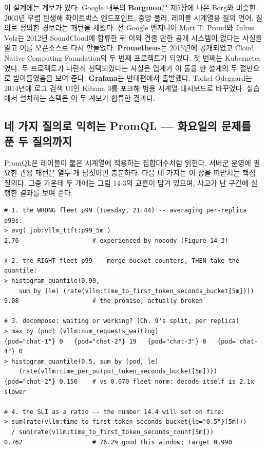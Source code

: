 이 설계에는 계보가 있다. Google 내부의 \textbf{Borgmon}은 제5장에 나온 Borg와 비슷한 2003년 무렵 탄생해 화이트박스  엔드포인트, 중앙 풀러, 레이블 시계열용 질의 언어, 질의로 정의한 경보라는 패턴을 세웠다. 전 Google 엔지니어 Matt T. Proud와 Julius Volz는 2012년 SoundCloud에 합류한 뒤 이와 견줄 만한 공개 시스템이 없다는 사실을 알고 이를 오픈소스로 다시 만들었다. \textbf{Prometheus}는 2015년에 공개되었고 Cloud Native Computing Foundation의 두 번째 프로젝트가 되었다. 첫 번째는 Kubernetes였다. 두 프로젝트가 나란히 선택되었다는 사실은 업계가 이 둘을 한 설계의 두 절반으로 받아들였음을 보여 준다. \textbf{Grafana}는 반대편에서 출발했다. Torkel Ödegaard는 2014년에 로그 검색 UI인 Kibana 3를 포크해 범용 시계열 대시보드로 바꾸었다. 실습에서 설치하는 스택은 이 두 계보가 합류한 결과다.

\subsection*{네 가지 질의로 익히는 PromQL — 화요일의 문제를 푼 두 질의까지}

PromQL은 레이블이 붙은 시계열에 적용하는 집합대수처럼 읽힌다. 서버군 운영에 필요한 관용 패턴은 열두 개 남짓이면 충분하다. 다음 네 가지는 이 장을 떠받치는 핵심 질의다. 그중 가운데 두 개에는 그림 14-3의 교훈이 담겨 있으며, 사고가 난 구간에 실행한 결과를 보여 준다.

\begin{terminalbox}
\begin{Verbatim}[breaklines=true,breakanywhere=true,fontsize=\small,formatcom=\color{tbbtermfg},codes=\tbbcodeactive]
# 1. the WRONG fleet p99 (tuesday, 21:44) -- averaging per-replica p99s:
> avg( job:vllm_ttft:p99_5m )
2.76                    # experienced by nobody (Figure 14-3)

# 2. the RIGHT fleet p99 -- merge bucket counters, THEN take the quantile:
> histogram_quantile(0.99,
    sum by (le) (rate(vllm:time_to_first_token_seconds_bucket[5m])))
9.08                    # the promise, actually broken

# 3. decompose: waiting or working? (Ch. 9's split, per replica)
> max by (pod) (vllm:num_requests_waiting)
{pod="chat-1"} 0   {pod="chat-2"} 19   {pod="chat-3"} 0   {pod="chat-4"} 0
> histogram_quantile(0.5, sum by (pod, le)
    (rate(vllm:time_per_output_token_seconds_bucket[5m])))
{pod="chat-2"} 0.150    # vs 0.070 fleet norm: decode itself is 2.1x slower

# 4. the SLI as a ratio -- the number 14.4 will set on fire:
> sum(rate(vllm:time_to_first_token_seconds_bucket{le="0.5"}[5m]))
  / sum(rate(vllm:time_to_first_token_seconds_count[5m]))
0.762                   # 76.2% good this window; target 0.990
\end{Verbatim}
\end{terminalbox}

